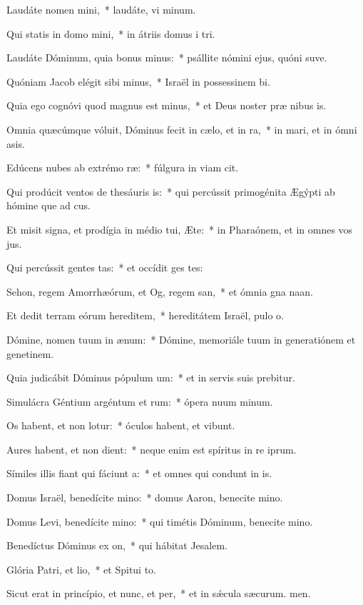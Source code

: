 \item Laudáte nomen mini,~* laudáte, vi minum.
\item Qui statis in domo mini,~* in átriis domus i tri.
\item Laudáte Dóminum, quia bonus minus:~* psállite nómini ejus, quóni suve.
\item Quóniam Jacob elégit sibi minus,~* Israël in possessinem bi.
\item Quia ego cognóvi quod magnus est minus,~* et Deus noster præ nibus is.
\item Omnia quæcúmque vóluit, Dóminus fecit in cælo, et in ra,~* in mari, et in ómni asis.
\item Edúcens nubes ab extrémo ræ:~* fúlgura in viam cit.
\item Qui prodúcit ventos de thesáuris is:~* qui percússit primogénita Ægýpti ab hómine que ad cus.
\item Et misit signa, et prodígia in médio tui, Æte:~* in Pharaónem, et in omnes vos jus.
\item Qui percússit gentes tas:~* et occídit ges tes:
\item Sehon, regem Amorrhæórum, et Og, regem san,~* et ómnia gna naan.
\item Et dedit terram eórum hereditem,~* hereditátem Israël, pulo o.
\item Dómine, nomen tuum in ænum:~* Dómine, memoriále tuum in generatiónem et genetinem.
\item Quia judicábit Dóminus pópulum um:~* et in servis suis prebitur.
\item Simulácra Géntium argéntum et rum:~* ópera nuum minum.
\item Os habent, et non lotur:~* óculos habent, et  vibunt.
\item Aures habent, et non dient:~* neque enim est spíritus in re iprum.
\item Símiles illis fiant qui fáciunt a:~* et omnes qui condunt in is.
\item Domus Israël, benedícite mino:~* domus Aaron, benecite mino.
\item Domus Levi, benedícite mino:~* qui timétis Dóminum, benecite mino.
\item Benedíctus Dóminus ex on,~* qui hábitat  Jesalem.
\item Glória Patri, et lio,~* et Spitui to.
\item Sicut erat in princípio, et nunc, et per,~* et in sǽcula sæcurum. men.
